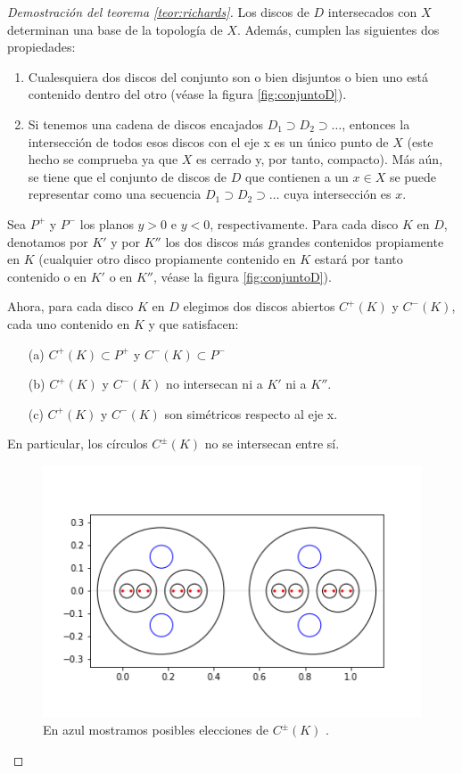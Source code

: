 \documentclass[a4paper,11pt,spanish, twoside, leqno]{tfg-uam}
\theoremstyle{definition}
\begin{document}
\begin{proof}[Demostración del teorema \ref{teor:richards}]
Los discos de $D$ intersecados con $X$ determinan una base de la topología de $X$. Además, cumplen las siguientes dos propiedades:
\begin{enumerate}
\item Cualesquiera dos discos del conjunto son o bien disjuntos o bien uno está contenido dentro del otro (véase la figura \ref{fig:conjuntoD}).
\item Si tenemos una cadena de discos encajados $D_1 \supset D_2 \supset \ldots$, entonces la intersección de todos esos discos  con el eje x es un único punto de $X$ (este hecho se comprueba ya que $X$ es cerrado y, por tanto, compacto). Más aún, se tiene que el conjunto de discos de $D$ que contienen a un $x \in X$ se puede representar como una secuencia $D_1 \supset D_2 \supset \ldots$ cuya intersección es $x$.
\end{enumerate}
Sea $P^+$ y $P^-$ los planos $y > 0 $ e $y < 0$, respectivamente. Para cada disco $K$ en $D$, denotamos por $K'$ y por $K''$ los dos discos más grandes contenidos propiamente en $K$ (cualquier otro disco propiamente contenido en $K$ estará por tanto contenido o en $K'$ o en $K''$, véase la figura \ref{fig:conjuntoD}).

Ahora, para cada disco $K$ en $D$ elegimos dos discos abiertos $C^+(K)$ y $C^-(K)$, cada uno contenido en $K$  y que satisfacen:
\begin{enumerate}
\item[(a)] $C^+(K) \subset P^+$ y $C^-(K) \subset P^-$
\item[(b)] $C^+(K)$ y $C^-(K)$ no intersecan ni a $K'$ ni a $K''$.
\item[(c)] $C^+(K)$ y $C^-(K)$ son simétricos respecto al eje x.
\end{enumerate}
En particular, los círculos $C^\pm(K)$ no se intersecan entre sí.

\begin{figure}[h!]
	\centering
	\includegraphics[width=0.5\linewidth]{imagenes/eleccionCK.png}
	\caption{En azul mostramos posibles elecciones de $C^\pm(K)$ .}
	\label{fig:eleccionCK}
\end{figure}


\end{proof}
\end{document}
